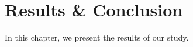 
\chapter{Results \& Conclusion\label{ch:conclusion}}

In this chapter, we present the results of our study.




